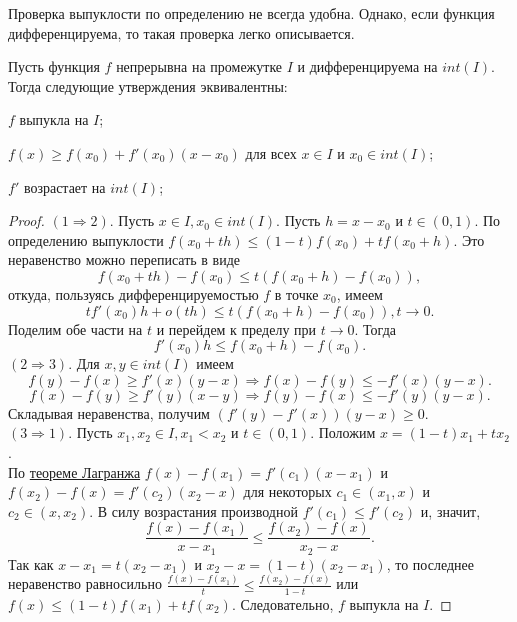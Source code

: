 Проверка выпуклости по определению не всегда удобна. Однако, если функция дифференцируема, то такая проверка легко описывается.

\begin{theorem}
    Пусть функция $f$ непрерывна на промежутке $I$ и дифференцируема на $int(I)$. Тогда следующие утверждения эквивалентны:
    \begin{enumerate}
        \item $f$ выпукла на $I$;
        \hypertarget{sec_punkt}{\item} $f(x) \geq f(x_{0}) + f'(x_{0})(x-x_{0})$ для всех $x \in I$ и $x_{0} \in int(I)$;
        \item $f'$ возрастает на $int(I)$;
    \end{enumerate}
\end{theorem}

\begin{proof}
    $(1 \Rightarrow 2)$. Пусть $x \in I, x_{0} \in int(I).$ Пусть $h = x - x_{0}$ и $t \in (0,1)$. По определению выпуклости $f(x_{0} + th) \leq (1-t)f(x_{0}) + tf(x_{0} + h)$. Это неравенство можно переписать в виде
    \[f(x_{0} + th) - f(x_{0}) \leq t(f(x_{0} + h) - f(x_{0})),\]
    откуда, пользуясь дифференцируемостью $f$ в точке $x_{0}$, имеем
    \[tf'(x_{0})h + o(th) \leq t(f(x_{0} + h) - f(x_{0})), t \to 0.\]
    Поделим обе части на $t$ и перейдем к пределу при $t \to 0$. Тогда 
    \[f'(x_{0})h \leq f(x_{0} + h) - f(x_{0}).\]
    $(2 \Rightarrow 3)$. Для $x,y \in int(I)$ имеем
    \[f(y) - f(x) \geq f'(x)(y-x) \Rightarrow f(x) - f(y) \leq -f'(x)(y-x).\]
    \[f(x) - f(y) \geq f'(y)(x-y) \Rightarrow f(y) - f(x) \leq -f'(y)(y-x).\]
    Складывая неравенства, получим $(f'(y) - f'(x))(y-x) \geq 0$.\\
    $(3 \Rightarrow 1)$. Пусть $x_{1}, x_{2} \in I, x_{1} < x_{2}$ и $t \in (0,1)$. Положим $x = (1-t)x_{1} + tx_{2}$.\\
    По \hyperlink{lagrange}{теореме Лагранжа} $f(x) - f(x_{1}) = f'(c_{1})(x-x_{1})$ и $f(x_{2}) - f(x) = f'(c_{2})(x_{2} - x)$ для некоторых $c_{1} \in (x_{1}, x)$ и $c_{2} \in (x, x_{2})$. В силу возрастания производной $f'(c_{1}) \leq f'(c_{2})$ и, значит,
    \[\frac{f(x) - f(x_{1})}{x - x_{1}} \leq \frac{f(x_{2}) - f(x)}{x_{2} - x}.\]
    Так как $x - x_{1} = t(x_{2} - x_{1})$ и $x_{2} - x = (1-t)(x_{2} - x_{1})$, то последнее неравенство равносильно $\frac{f(x) - f(x_{1})}{t} \leq \frac{f(x_{2}) - f(x)}{1 - t}$ или $f(x) \leq (1-t)f(x_{1}) + tf(x_{2})$. Следовательно, $f$ выпукла на $I$.
\end{proof}

